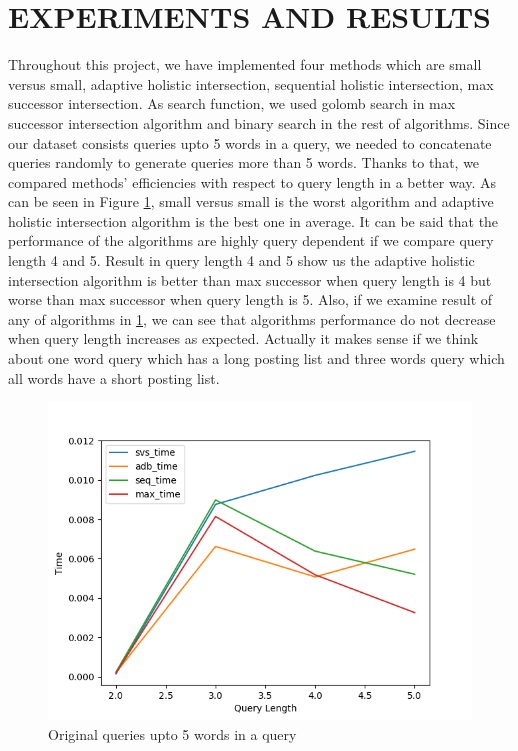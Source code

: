 \documentclass[paper=a4, fontsize=11pt]{scrartcl} %
\numberwithin{equation}{section} %
\numberwithin{figure}{section} %
\numberwithin{table}{section} %
\begin{document}
\section{EXPERIMENTS AND RESULTS}
Throughout this project, we have implemented four methods which are small versus small, adaptive holistic intersection, sequential holistic intersection, max successor intersection. As search function, we used golomb search in max successor intersection algorithm and binary search in the rest of algorithms. Since our dataset consists queries upto 5 words in a query,  we needed to concatenate queries randomly to generate queries more than 5 words. Thanks to that, we compared methods' efficiencies with respect to query length in a better way. As can be seen in Figure \ref{fig:result_normal}, small versus small is the worst algorithm and adaptive holistic intersection algorithm is the best one in average. It can be said that the performance of the algorithms are highly query dependent if we compare query length 4 and 5. Result in query length 4 and 5 show us the adaptive holistic intersection algorithm is better than max successor when query length is 4 but worse than max successor when query length is 5. Also, if we examine result of any of algorithms in \ref{fig:result_normal}, we can see that algorithms performance do not decrease when query length increases as expected. Actually it makes sense if we think about one word query which has a long posting list and three words query which all words have a short posting list.
 


\begin{figure}[H]
   \includegraphics[width=\textwidth]{result_}
  \caption{ Original queries upto 5 words in a query}
  \label{fig:result_normal}
\end{figure}
\end{document}
